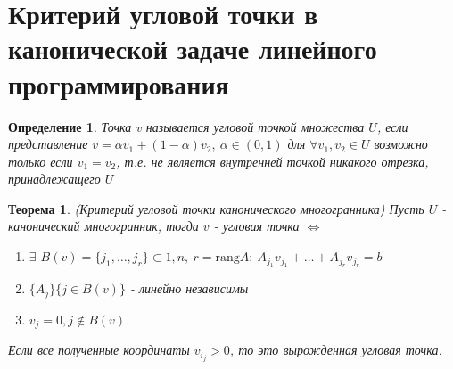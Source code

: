 \documentclass[9pt, a4paper]{extarticle}
\newtheorem*{theorem}{Теорема}
\newtheorem*{definition}{Определение}
\begin{document}
\section{Критерий угловой точки в канонической задаче линейного программирования}
		\begin{definition}
		Точка v называется угловой точкой множества $U$, если представление $v = \alpha v_1 + (1-\alpha) v_2, \ \alpha \in (0,1)$ для $\forall v_1, v_2 \in U$ возможно только если $v_1 = v_2$, т.е. не является внутренней точкой никакого отрезка, принадлежащего $U$
	\end{definition}
	\begin{theorem}
			(Критерий угловой точки канонического многогранника)\newline
			Пусть $U$ - канонический многогранник, тогда $v$ - угловая точка $\Leftrightarrow$ 
			\begin{enumerate}
				\item $\exists$ $B(v) = \{j_1, \dots , j_r\} \subset \overline{1,n}, \  r= \text{rang} A: \ A_{j_1} v_{j_1}+ \dots + A_{j_r} v_{j_r} = b$
				\item $\{A_j\}\{j \in B(v)\}$ - линейно независимы
				\item $v_j = 0, j \notin B(v)$. 
			\end{enumerate}
			Если все полученные координаты $v_{i_j}> 0$, то это вырожденная угловая точка. 
	\end{theorem}
\end{document}
